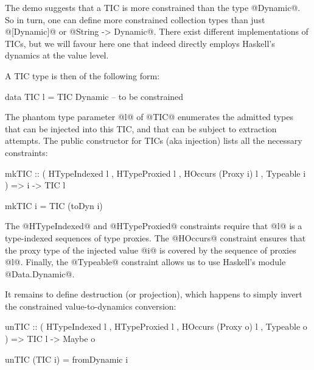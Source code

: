 \documentclass[nocopyrightspace,preprint]{sigplan-proc}
\begin{document}
The demo suggests that a TIC is more constrained than the type
@Dynamic@.  So in turn, one can define more constrained collection
types than just @[Dynamic]@ or @String -> Dynamic@. There exist
different implementations of TICs, but we will favour here one that
indeed directly employs Haskell's dynamics at the value level.

A TIC type is then of the following form:

\begin{code}
 data TIC l = TIC Dynamic -- to be constrained
\end{code}

The phantom type parameter @l@ of @TIC@ enumerates the admitted types
that can be injected into this TIC, and that can be subject to
extraction attempts. The public constructor for TICs (aka injection)
lists all the necessary constraints:

\begin{code}
 mkTIC :: ( HTypeIndexed l
          , HTypeProxied l
          , HOccurs (Proxy i) l
          , Typeable i
          ) 
       => i -> TIC l
\end{code}

\begin{code}
 mkTIC i = TIC (toDyn i)
\end{code}

The @HTypeIndexed@ and @HTypeProxied@ constraints require that @l@ is
a type-indexed sequences of type proxies. The @HOccurs@ constraint
ensures that the proxy type of the injected value @i@ is covered by
the sequence of proxies @l@. Finally, the @Typeable@ constraint allows
us to use Haskell's module @Data.Dynamic@.

It remains to define destruction (or projection), which happens to
simply invert the constrained value-to-dynamics conversion:

\begin{code} 
 unTIC :: ( HTypeIndexed l
          , HTypeProxied l
          , HOccurs (Proxy o) l
          , Typeable o
          ) 
       => TIC l -> Maybe o
\end{code}

\begin{code} 
 unTIC (TIC i) = fromDynamic i
\end{code}



\end{document}
